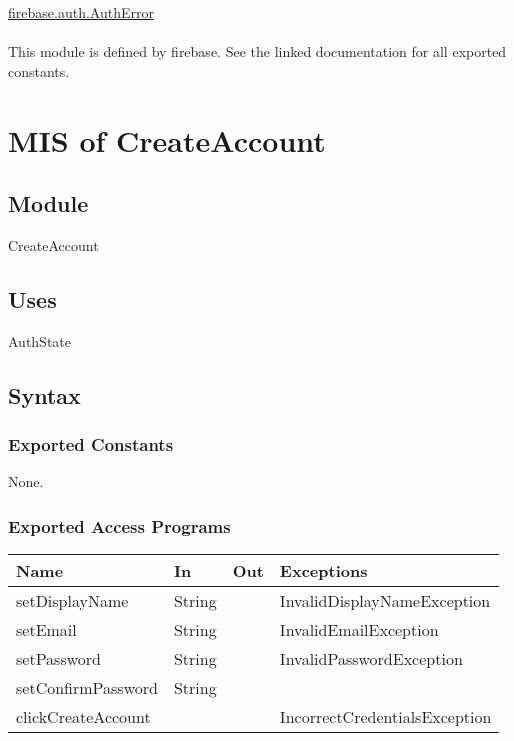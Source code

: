 \documentclass[12pt, titlepage]{article}
\begin{document}
\href{https://firebase.google.com/docs/reference/js/auth.autherror}{firebase.auth.AuthError} \\ \\
This module is defined by firebase. See the linked documentation for all exported constants.
  
\medskip
\newpage
\section{MIS of CreateAccount} \label{CreateAccount} 

\subsection{Module}

CreateAccount

\subsection{Uses}

AuthState

\subsection{Syntax}

\subsubsection{Exported Constants}
None.
\subsubsection{Exported Access Programs}

\begin{center}
\begin{tabular}{p{4cm} p{2cm} p{4cm} p{2cm}}
\hline
\textbf{Name} & \textbf{In} & \textbf{Out} & \textbf{Exceptions} \\
\hline
setDisplayName & String &  & InvalidDisplayNameException \\ \hline
setEmail & String &  & InvalidEmailException \\ \hline
setPassword & String &  & InvalidPasswordException \\ \hline
setConfirmPassword & String & \\ \hline
clickCreateAccount &  &  & IncorrectCredentialsException \\
\hline
\end{tabular}
\end{center}
\end{document}
